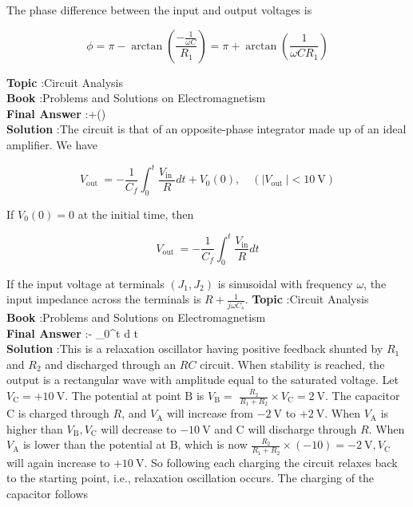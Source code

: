 \documentclass[10pt]{article}
\begin{document}
The phase difference between the input and output voltages is

$$
\phi=\pi-\arctan \left(\frac{-\frac{1}{\omega C}}{R_{1}}\right)=\pi+\arctan \left(\frac{1}{\omega C R_{1}}\right)
$$

\textbf{Topic} :Circuit Analysis\\
\textbf{Book} :Problems and Solutions on Electromagnetism\\
\textbf{Final Answer} :\pi+\arctan \left(\right)\\


\textbf{Solution} :The circuit is that of an opposite-phase integrator made up of an ideal amplifier. We have

$$
V_{\text {out }}=-\frac{1}{C_{f}} \int_{0}^{t} \frac{V_{\text {in }}}{R} d t+V_{0}(0), \quad\left(\left|V_{\text {out }}\right|<10 \mathrm{~V}\right)
$$

If $V_{0}(0)=0$ at the initial time, then

$$
V_{\text {out }}=-\frac{1}{C_{f}} \int_{0}^{t} \frac{V_{\mathrm{in}}}{R} d t
$$

 If the input voltage at terminals $\left(J_{1}, J_{2}\right)$ is sinusoidal with frequency $\omega$, the input impedance across the terminals is $R+\frac{1}{j \omega C_{s}}$.
\textbf{Topic} :Circuit Analysis\\
\textbf{Book} :Problems and Solutions on Electromagnetism\\
\textbf{Final Answer} :- \int_{0}^{t}  d t\\


\textbf{Solution} :This is a relaxation oscillator having positive feedback shunted by $R_{1}$ and $R_{2}$ and discharged through an $R C$ circuit. When stability is reached, the output is a rectangular wave with amplitude equal to the saturated voltage. Let $V_{\mathrm{C}}=+10 \mathrm{~V}$. The potential at point $\mathrm{B}$ is $V_{\mathrm{B}}=$ $\frac{R_{2}}{R_{1}+R_{2}} \times V_{\mathrm{C}}=2 \mathrm{~V}$. The capacitor $\mathrm{C}$ is charged through $R$, and $V_{\mathrm{A}}$ will increase from $-2 \mathrm{~V}$ to $+2 \mathrm{~V}$. When $V_{\mathrm{A}}$ is higher than $V_{\mathrm{B}}, V_{\mathrm{C}}$ will decrease to $-10 \mathrm{~V}$ and $\mathrm{C}$ will discharge through $R$. When $V_{\mathrm{A}}$ is lower than the potential at $\mathrm{B}$, which is now $\frac{R_{2}}{R_{1}+R_{2}} \times(-10)=-2 \mathrm{~V}, V_{\mathrm{C}}$ will again increase to $+10 \mathrm{~V}$. So following each charging the circuit relaxes back to the starting point, i.e., relaxation oscillation occurs. The charging of the capacitor follows
\end{document}
